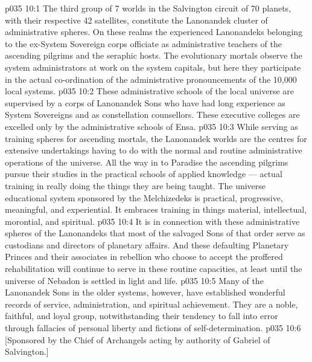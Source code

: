 \vs p035 10:1 The third group of 7 worlds in the Salvington circuit of 70 planets, with their respective 42 satellites, constitute the Lanonandek cluster of administrative spheres. On these realms the experienced Lanonandeks belonging to the ex\hyp{}System Sovereign corps officiate as administrative teachers of the ascending pilgrims and the seraphic hosts. The evolutionary mortals observe the system administrators at work on the system capitals, but here they participate in the actual co\hyp{}ordination of the administrative pronouncements of the 10,000 local systems.
\vs p035 10:2 These administrative schools of the local universe are supervised by a corps of Lanonandek Sons who have had long experience as System Sovereigns and as constellation counsellors. These executive colleges are excelled only by the administrative schools of Ensa.
\vs p035 10:3 While serving as training spheres for ascending mortals, the Lanonandek worlds are the centres for extensive undertakings having to do with the normal and routine administrative operations of the universe. All the way in to Paradise the ascending pilgrims pursue their studies in the practical schools of applied knowledge --- actual training in really doing the things they are being taught. The universe educational system sponsored by the Melchizedeks is practical, progressive, meaningful, and experiential. It embraces training in things material, intellectual, morontial, and spiritual.
\vs p035 10:4 \pc It is in connection with these administrative spheres of the Lanonandeks that most of the salvaged Sons of that order serve as custodians and directors of planetary affairs. And these defaulting Planetary Princes and their associates in rebellion who choose to accept the proffered rehabilitation will continue to serve in these routine capacities, at least until the universe of Nebadon is settled in light and life.
\vs p035 10:5 \pc Many of the Lanonandek Sons in the older systems, however, have established wonderful records of service, administration, and spiritual achievement. They are a noble, faithful, and loyal group, notwithstanding their tendency to fall into error through fallacies of personal liberty and fictions of self\hyp{}determination.
\vsetoff
\vs p035 10:6 [Sponsored by the Chief of Archangels acting by authority of Gabriel of Salvington.]
\quizlink

